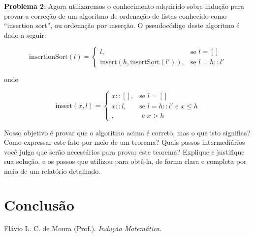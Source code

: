 \documentclass[a4paper, 10pt]{article}
\begin{document}
\textbf{Problema 2}: Agora utilizaremos o conhecimento adquirido sobre indução para provar a correção de um algoritmo de ordenação de listas conhecido como ``insertion sort'', ou ordenação por inserção. O pseudocódigo deste algoritmo é dado a seguir:

    \begin{equation*}
        \textrm{insertionSort}(l) =
        \left\{
      \begin{array}{ll}
        l, & \textrm{se } l = [] \\
        \textrm{insert}(h, \textrm{insertSort}(l')), & \textrm{se } l = h :: l'
      \end{array}
    \right.
    \end{equation*}
		
onde 

    \begin{equation*}
        \textrm{insert}(x,l) =
        \left\{
      \begin{array}{ll}
        x::[], & \textrm{se } l = [] \\
        x::l, & \textrm{se } l = h::l' \textrm{ e } x \leq h \\
        , & \textrm{ e } x > h 
      \end{array}
    \right.
    \end{equation*}

Nosso objetivo é provar que o algoritmo acima é correto, mas o que isto significa? Como expressar este fato por meio de um teorema? Quais passos intermediários você julga que serão necessários para provar este teorema? Explique e justifique sua solução, e os passos que utilizou para obtê-la, de forma clara e completa por meio de um relatório detalhado\cite{Apostila}.


\section{Conclusão}

\begin{thebibliography}{9}

Flávio L. C. de Moura (Prof.).
\textit{Indução Matemática}.


\end{thebibliography}

\printindex
\end{document}
